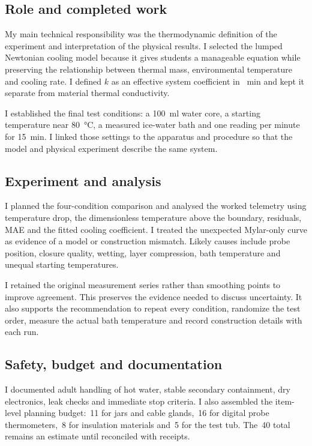 \documentclass[9pt,a4paper]{extarticle}
\newcommand{\EUR}[1]{\texteuro\,#1}
\begin{document}
\subsection*{Role and completed work}
My main technical responsibility was the thermodynamic definition of the experiment and interpretation of the physical results. I selected the lumped Newtonian cooling model because it gives students a manageable equation while preserving the relationship between thermal mass, environmental temperature and cooling rate. I defined $k$ as an effective system coefficient in \si{\per\minute} and kept it separate from material thermal conductivity.

I established the final test conditions: a \SI{100}{\milli\litre} water core, a starting temperature near \SI{80}{\celsius}, a measured ice-water bath and one reading per minute for \SI{15}{\minute}. I linked those settings to the apparatus and procedure so that the model and physical experiment describe the same system.

\subsection*{Experiment and analysis}
I planned the four-condition comparison and analysed the worked telemetry using temperature drop, the dimensionless temperature above the boundary, residuals, MAE and the fitted cooling coefficient. I treated the unexpected Mylar-only curve as evidence of a model or construction mismatch. Likely causes include probe position, closure quality, wetting, layer compression, bath temperature and unequal starting temperatures.

I retained the original measurement series rather than smoothing points to improve agreement. This preserves the evidence needed to discuss uncertainty. It also supports the recommendation to repeat every condition, randomize the test order, measure the actual bath temperature and record construction details with each run.

\subsection*{Safety, budget and documentation}
I documented adult handling of hot water, stable secondary containment, dry electronics, leak checks and immediate stop criteria. I also assembled the item-level planning budget: \EUR{11} for jars and cable glands, \EUR{16} for digital probe thermometers, \EUR{8} for insulation materials and \EUR{5} for the test tub. The \EUR{40} total remains an estimate until reconciled with receipts.
\end{document}

